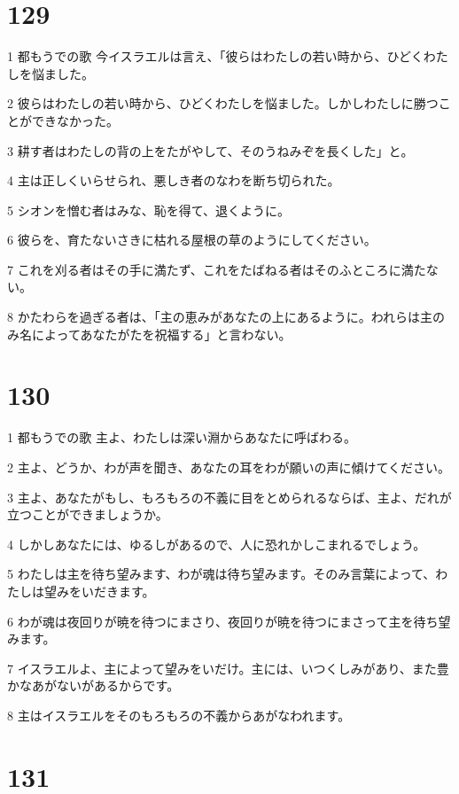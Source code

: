 \chapter{129}

\par 1 都もうでの歌 今イスラエルは言え、「彼らはわたしの若い時から、ひどくわたしを悩ました。
\par 2 彼らはわたしの若い時から、ひどくわたしを悩ました。しかしわたしに勝つことができなかった。
\par 3 耕す者はわたしの背の上をたがやして、そのうねみぞを長くした」と。
\par 4 主は正しくいらせられ、悪しき者のなわを断ち切られた。
\par 5 シオンを憎む者はみな、恥を得て、退くように。
\par 6 彼らを、育たないさきに枯れる屋根の草のようにしてください。
\par 7 これを刈る者はその手に満たず、これをたばねる者はそのふところに満たない。
\par 8 かたわらを過ぎる者は、「主の恵みがあなたの上にあるように。われらは主のみ名によってあなたがたを祝福する」と言わない。

\chapter{130}

\par 1 都もうでの歌 主よ、わたしは深い淵からあなたに呼ばわる。
\par 2 主よ、どうか、わが声を聞き、あなたの耳をわが願いの声に傾けてください。
\par 3 主よ、あなたがもし、もろもろの不義に目をとめられるならば、主よ、だれが立つことができましょうか。
\par 4 しかしあなたには、ゆるしがあるので、人に恐れかしこまれるでしょう。
\par 5 わたしは主を待ち望みます、わが魂は待ち望みます。そのみ言葉によって、わたしは望みをいだきます。
\par 6 わが魂は夜回りが暁を待つにまさり、夜回りが暁を待つにまさって主を待ち望みます。
\par 7 イスラエルよ、主によって望みをいだけ。主には、いつくしみがあり、また豊かなあがないがあるからです。
\par 8 主はイスラエルをそのもろもろの不義からあがなわれます。

\chapter{131}

